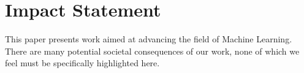 \documentclass{article}
\theoremstyle{plain}
\theoremstyle{definition}
\theoremstyle{remark}
\begin{document}
\printAffiliationsAndNotice{}  %












\section*{Impact Statement} 
This paper presents work aimed at advancing the field of Machine Learning. There are many potential societal consequences of our work, none of which we feel must be specifically highlighted here.



\newpage
\appendix
\onecolumn


\end{document}
